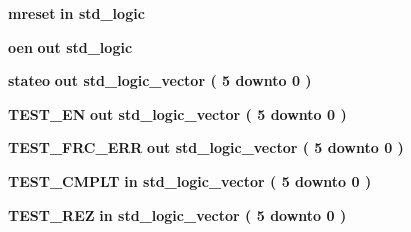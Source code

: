 \begin{DoxyCompactItemize}
\item 
{\bf mreset}  {\bfseries {\bfseries \textcolor{keywordflow}{in}\textcolor{vhdlchar}{ }}} {\bfseries \textcolor{comment}{std\+\_\+logic}\textcolor{vhdlchar}{ }} 
\item 
{\bf oen}  {\bfseries {\bfseries \textcolor{keywordflow}{out}\textcolor{vhdlchar}{ }}} {\bfseries \textcolor{comment}{std\+\_\+logic}\textcolor{vhdlchar}{ }} 
\item 
{\bf stateo}  {\bfseries {\bfseries \textcolor{keywordflow}{out}\textcolor{vhdlchar}{ }}} {\bfseries \textcolor{comment}{std\+\_\+logic\+\_\+vector}\textcolor{vhdlchar}{ }\textcolor{vhdlchar}{(}\textcolor{vhdlchar}{ }\textcolor{vhdlchar}{ } \textcolor{vhdldigit}{5} \textcolor{vhdlchar}{ }\textcolor{keywordflow}{downto}\textcolor{vhdlchar}{ }\textcolor{vhdlchar}{ } \textcolor{vhdldigit}{0} \textcolor{vhdlchar}{ }\textcolor{vhdlchar}{)}\textcolor{vhdlchar}{ }} 
\item 
{\bf T\+E\+S\+T\+\_\+\+EN}  {\bfseries {\bfseries \textcolor{keywordflow}{out}\textcolor{vhdlchar}{ }}} {\bfseries \textcolor{comment}{std\+\_\+logic\+\_\+vector}\textcolor{vhdlchar}{ }\textcolor{vhdlchar}{(}\textcolor{vhdlchar}{ }\textcolor{vhdlchar}{ } \textcolor{vhdldigit}{5} \textcolor{vhdlchar}{ }\textcolor{keywordflow}{downto}\textcolor{vhdlchar}{ }\textcolor{vhdlchar}{ } \textcolor{vhdldigit}{0} \textcolor{vhdlchar}{ }\textcolor{vhdlchar}{)}\textcolor{vhdlchar}{ }} 
\item 
{\bf T\+E\+S\+T\+\_\+\+F\+R\+C\+\_\+\+E\+RR}  {\bfseries {\bfseries \textcolor{keywordflow}{out}\textcolor{vhdlchar}{ }}} {\bfseries \textcolor{comment}{std\+\_\+logic\+\_\+vector}\textcolor{vhdlchar}{ }\textcolor{vhdlchar}{(}\textcolor{vhdlchar}{ }\textcolor{vhdlchar}{ } \textcolor{vhdldigit}{5} \textcolor{vhdlchar}{ }\textcolor{keywordflow}{downto}\textcolor{vhdlchar}{ }\textcolor{vhdlchar}{ } \textcolor{vhdldigit}{0} \textcolor{vhdlchar}{ }\textcolor{vhdlchar}{)}\textcolor{vhdlchar}{ }} 
\item 
{\bf T\+E\+S\+T\+\_\+\+C\+M\+P\+LT}  {\bfseries {\bfseries \textcolor{keywordflow}{in}\textcolor{vhdlchar}{ }}} {\bfseries \textcolor{comment}{std\+\_\+logic\+\_\+vector}\textcolor{vhdlchar}{ }\textcolor{vhdlchar}{(}\textcolor{vhdlchar}{ }\textcolor{vhdlchar}{ } \textcolor{vhdldigit}{5} \textcolor{vhdlchar}{ }\textcolor{keywordflow}{downto}\textcolor{vhdlchar}{ }\textcolor{vhdlchar}{ } \textcolor{vhdldigit}{0} \textcolor{vhdlchar}{ }\textcolor{vhdlchar}{)}\textcolor{vhdlchar}{ }} 
\item 
{\bf T\+E\+S\+T\+\_\+\+R\+EZ}  {\bfseries {\bfseries \textcolor{keywordflow}{in}\textcolor{vhdlchar}{ }}} {\bfseries \textcolor{comment}{std\+\_\+logic\+\_\+vector}\textcolor{vhdlchar}{ }\textcolor{vhdlchar}{(}\textcolor{vhdlchar}{ }\textcolor{vhdlchar}{ } \textcolor{vhdldigit}{5} \textcolor{vhdlchar}{ }\textcolor{keywordflow}{downto}\textcolor{vhdlchar}{ }\textcolor{vhdlchar}{ } \textcolor{vhdldigit}{0} \textcolor{vhdlchar}{ }\textcolor{vhdlchar}{)}\textcolor{vhdlchar}{ }} 

\end{DoxyCompactItemize}
